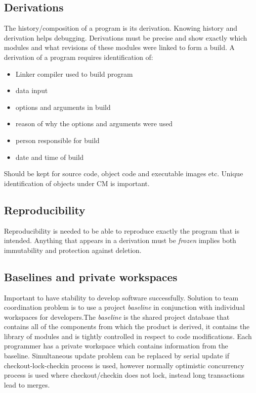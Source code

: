 \documentclass{article}
\begin{document}
\subsection{Derivations}
The history/composition of a program is its derivation. Knowing history and derivation helps debugging. Derivations must be precise and show exactly which modules and what revisions of these modules were linked to form a build. A derivation of a program requires identification of:

\begin{itemize}
    \item Linker compiler used to build program
    \item data input
    \item options and arguments in build
    \item reason of why the options and arguments were used
    \item person responsible for build
    \item date and time of build
\end{itemize}
Should be kept for source code, object code and executable images etc.
Unique identification of objects under CM is important.

\subsection{Reproducibility}
Reproducibility is needed to be able to reproduce exactly the program that is intended.
Anything that appears in a derivation must be \textit{frozen} implies both immutability and protection against deletion.

\subsection{Baselines and private workspaces}
Important to have stability to develop software successfully. Solution to team coordination problem is to use a project \textit{baseline} in conjunction with individual workspaces for developers.The \textit{baseline} is the shared project database that contains all of the components from which the product is derived, it contains the library of modules and is tightly controlled in respect to code modifications. Each programmer has a private workspace which contains information from the baseline. Simultaneous update problem can be replaced by serial update if checkout-lock-checkin process is used, however normally optimistic concurrency process is used where checkout/checkin does not lock, instead long transactions lead to merges.
\end{document}
